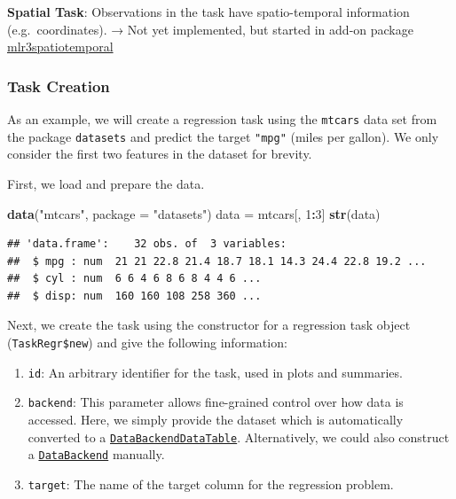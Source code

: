\documentclass[]{article}
\newenvironment{Shaded}{\begin{snugshade}}{\end{snugshade}}
\newcommand{\DataTypeTok}[1]{\textcolor[rgb]{0.13,0.29,0.53}{#1}}
\newcommand{\DecValTok}[1]{\textcolor[rgb]{0.00,0.00,0.81}{#1}}
\newcommand{\KeywordTok}[1]{\textcolor[rgb]{0.13,0.29,0.53}{\textbf{#1}}}
\newcommand{\NormalTok}[1]{#1}
\newcommand{\OperatorTok}[1]{\textcolor[rgb]{0.81,0.36,0.00}{\textbf{#1}}}
\newcommand{\StringTok}[1]{\textcolor[rgb]{0.31,0.60,0.02}{#1}}
\providecommand{\tightlist}{%
  \setlength{\itemsep}{0pt}\setlength{\parskip}{0pt}}
\renewenvironment{Shaded} {\begin{snugshade}\small} {\end{snugshade}}
\begin{document}
\textbf{Spatial Task}: Observations in the task have spatio-temporal information (e.g.~coordinates).
→ Not yet implemented, but started in add-on package \href{https://mlr3spatiotemporal.mlr-org.com}{mlr3spatiotemporal}

\hypertarget{tasks-creation}{%
\subsubsection{Task Creation}\label{tasks-creation}}

As an example, we will create a regression task using the \texttt{mtcars} data set from the package \texttt{datasets} and predict the target \texttt{"mpg"} (miles per gallon).
We only consider the first two features in the dataset for brevity.

First, we load and prepare the data.

\begin{Shaded}
\begin{Highlighting}[]
\KeywordTok{data}\NormalTok{(}\StringTok{"mtcars"}\NormalTok{, }\DataTypeTok{package =} \StringTok{"datasets"}\NormalTok{)}
\NormalTok{data =}\StringTok{ }\NormalTok{mtcars[, }\DecValTok{1}\OperatorTok{:}\DecValTok{3}\NormalTok{]}
\KeywordTok{str}\NormalTok{(data)}
\end{Highlighting}
\end{Shaded}

\begin{verbatim}
## 'data.frame':    32 obs. of  3 variables:
##  $ mpg : num  21 21 22.8 21.4 18.7 18.1 14.3 24.4 22.8 19.2 ...
##  $ cyl : num  6 6 4 6 8 6 8 4 4 6 ...
##  $ disp: num  160 160 108 258 360 ...
\end{verbatim}

Next, we create the task using the constructor for a regression task object (\texttt{TaskRegr\$new}) and give the following information:

\begin{enumerate}
\def\labelenumi{\arabic{enumi}.}
\tightlist
\item
  \texttt{id}: An arbitrary identifier for the task, used in plots and summaries.
\item
  \texttt{backend}: This parameter allows fine-grained control over how data is accessed.
  Here, we simply provide the dataset which is automatically converted to a \href{https://mlr3.mlr-org.com/reference/DataBackendDataTable.html}{\texttt{DataBackendDataTable}}.
  Alternatively, we could also construct a \href{https://mlr3.mlr-org.com/reference/DataBackend.html}{\texttt{DataBackend}} manually.
\item
  \texttt{target}: The name of the target column for the regression problem.
\end{enumerate}
\end{document}

